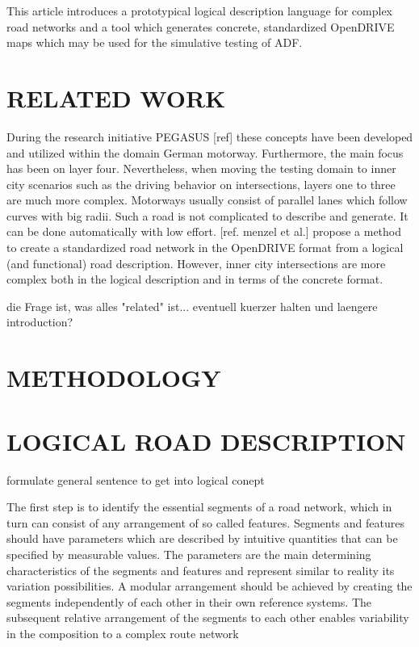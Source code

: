 \documentclass[a4paper, 10pt, conference]{ieeeconf}      %
\begin{document}
This article introduces a prototypical logical description language for complex road networks and a tool which generates concrete, standardized OpenDRIVE maps which may be used for the simulative testing of ADF.

\section{RELATED WORK}
During the research initiative PEGASUS [ref] these concepts have been developed and utilized within the domain German motorway. Furthermore, the main focus has been on layer four. Nevertheless, when moving the testing domain to inner city scenarios such as the driving behavior on intersections, layers one to three are much more complex. Motorways usually consist of parallel lanes which follow curves with big radii. Such a road is not complicated to describe and generate. It can be done automatically with low effort. [ref. menzel et al.] propose a method to create a standardized road network in the OpenDRIVE format from a logical (and functional) road description. However, inner city intersections are more complex both in the logical description and in terms of the concrete format. 

die Frage ist, was alles "related" ist... eventuell kuerzer halten und laengere introduction?

\section{METHODOLOGY}

\section{LOGICAL ROAD DESCRIPTION}
formulate general sentence to get into logical conept

The first step is to identify the essential segments of a road network, which in turn can consist of any arrangement of so called features. Segments and features should have parameters which are described by intuitive quantities that can be specified by measurable values. The parameters are the main determining characteristics of the segments and features and represent similar to reality its variation possibilities. A modular arrangement should be achieved by creating the segments independently of each other in their own reference systems. The subsequent relative arrangement of the segments to each other enables variability in the composition to a complex route network
\end{document}
